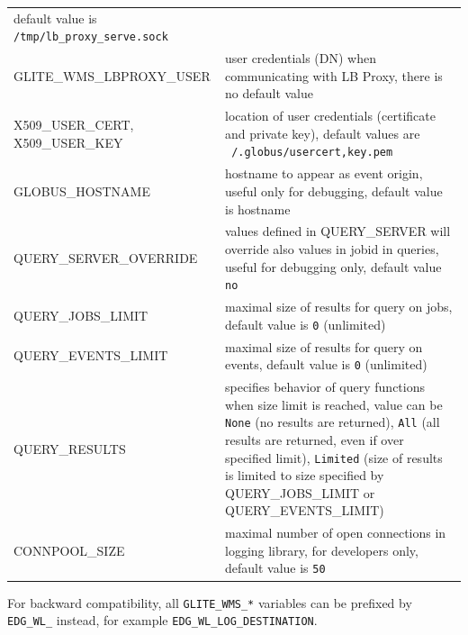 \begin{tabularx}{\textwidth}{l>{\raggedright\arraybackslash}X}
   default value is \texttt{/tmp/lb\_proxy\_serve.sock} \\
GLITE\_WMS\_LBPROXY\_USER &
   user credentials (DN) when communicating with LB Proxy,  
   there is no default value \\
X509\_USER\_CERT, X509\_USER\_KEY & 
   location of user credentials (certificate and private key),
   default values are \texttt{~/.globus/user{cert,key}.pem} \\
GLOBUS\_HOSTNAME & 
   hostname to appear as event origin, useful only for debugging, 
   default value is hostname \\
QUERY\_SERVER\_OVERRIDE & 
   values defined in QUERY\_SERVER will override also values in jobid in queries,
   useful for debugging only, 
   default value \texttt{no} \\
QUERY\_JOBS\_LIMIT & 
   maximal size of results for query on jobs, 
   default value is  \texttt{0} (unlimited) \\
QUERY\_EVENTS\_LIMIT & 
   maximal size of results for query on events, 
   default value is  \texttt{0} (unlimited) \\
QUERY\_RESULTS & 
   specifies behavior of query functions when size limit is reached,
   value can be \texttt{None} (no results are returned),
   \texttt{All} (all results are returned, even if over specified limit),
   \texttt{Limited} (size of results is limited to size specified by QUERY\_JOBS\_LIMIT
   or QUERY\_EVENTS\_LIMIT) \\
CONNPOOL\_SIZE & 
   maximal number of open connections in logging library,
   for developers only,
   default value is \texttt{50} \\
\end{tabularx}

For backward compatibility, all \verb'GLITE_WMS_*' variables can be prefixed by
\verb'EDG_WL_' instead, for example \verb'EDG_WL_LOG_DESTINATION'.

